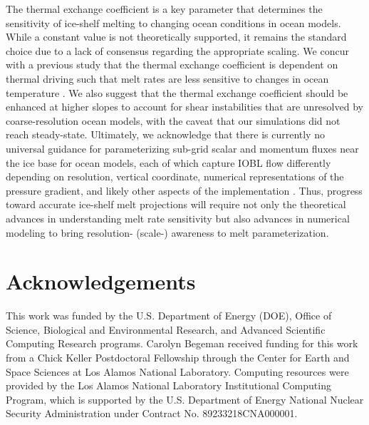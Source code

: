 \documentclass[draft]{agujournal2019}
\begin{document}
The thermal exchange coefficient is a key parameter that determines the sensitivity of ice-shelf melting to changing ocean conditions in ocean models. While a constant value is not theoretically supported, it remains the standard choice due to a lack of consensus regarding the appropriate scaling. We concur with a previous study that the thermal exchange coefficient is dependent on thermal driving such that melt rates are less sensitive to changes in ocean temperature \cite{vreugdenhil_stratification_2019}. We also suggest that the thermal exchange coefficient should be enhanced at higher slopes to account for shear instabilities that are unresolved by coarse-resolution ocean models, with the caveat that our simulations did not reach steady-state. Ultimately, we acknowledge that there is currently no universal guidance for parameterizing sub-grid scalar and momentum fluxes near the ice base for ocean models, each of which capture IOBL flow differently depending on resolution, vertical coordinate, numerical representations of the pressure gradient, and likely other aspects of the implementation \cite{gwyther_cold_2020}. Thus, progress toward accurate ice-shelf melt projections will require not only the theoretical advances in understanding melt rate sensitivity but also advances in numerical modeling to bring resolution- (scale-) awareness to melt parameterization.


\section{Acknowledgements}

This work was funded by the U.S. Department of Energy (DOE), Office of Science, Biological and Environmental Research, and Advanced Scientific Computing Research programs. Carolyn Begeman received funding for this work from a Chick Keller Postdoctoral Fellowship through the Center for Earth and Space Sciences at Los Alamos National Laboratory. Computing resources were provided by the Los Alamos National Laboratory Institutional Computing Program, which is supported by the U.S. Department of Energy National Nuclear Security Administration under Contract No. 89233218CNA000001.

\newpage

\end{document}
